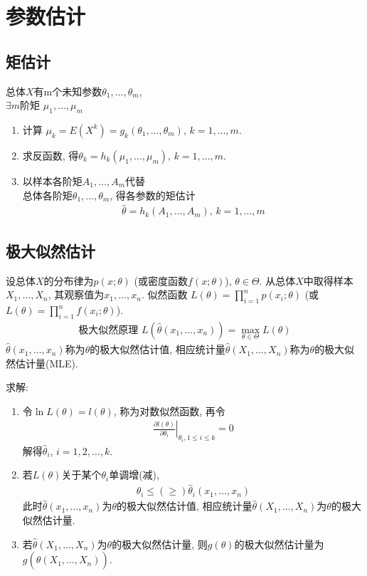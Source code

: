 \newpage
\section{参数估计}

\subsection{矩估计}
总体$X$有m个未知参数$\theta_1,\dots,\theta_m$, \\$\exists m$阶矩 $\mu_1,\dots,\mu_m$
\begin{enumerate}
    \item 计算 $\mu_k=E(X^k)=g_k(\theta_1,\dots,\theta_m),\,k=1,\dots,m$.
    \item 求反函数, 得$\theta_k=h_k(\mu_1,\dots,\mu_m),\,k=1,\dots,m$.
    \item 以样本各阶矩$A_1,\dots,A_m$代替\\总体各阶矩$\theta_1,\dots,\theta_m$, 得各参数的矩估计
    \begin{align*}
        \hat{\theta}=h_k(A_1,\dots,A_m),\,k=1,\dots,m
    \end{align*}
\end{enumerate}

\subsection{极大似然估计}
设总体$X$的分布律为$p(x;\theta)$ (或密度函数$f(x;\theta)$), $\theta\in \Theta$. 从总体$X$中取得样本$X_1,\dots,X_n$, 其观察值为$x_1,\dots,x_n$. 似然函数 $L(\theta)=\prod_{i=1}^n p(x_i;\theta)$ (或$L(\theta)=\prod_{i=1}^n f(x_i;\theta)$). 
\begin{align*}
    \text{极大似然原理 }L\left(\hat{\theta}(x_1,\dots,x_n)\right)=\max_{\theta\in \Theta}L(\theta)
\end{align*}
$\hat{\theta}(x_1,\dots,x_n)$称为$\theta$的极大似然估计值, 相应统计量$\hat{\theta}(X_1,\dots,X_n)$称为$\theta$的极大似然估计量(MLE). 

求解:
\begin{enumerate}
    \item 令$\ln L(\theta)=l(\theta)$, 称为对数似然函数, 再令
    \begin{align*}
        \left.\frac{\partial l(\theta)}{\partial \theta_i}\right|_{\hat{\theta}_i, 1\le i \le k}=0
    \end{align*}
    解得$\hat{\theta}_i$, $i=1,2,\dots,k$. 
    \item 若$L(\theta)$关于某个$\theta_i$单调增(减),
    \begin{align*}
        \theta_i \le (\ge) \hat{\theta}_i(x_1,\dots,x_n)
    \end{align*}
    此时$\hat{\theta}(x_1,\dots,x_n)$为$\theta$的极大似然估计值, 相应统计量$\hat{\theta}(X_1,\dots,X_n)$为$\theta$的极大似然估计量. 
    \item 若$\hat{\theta}(X_1,\dots,X_n)$为$\theta$的极大似然估计量, 则$g(\theta)$的极大似然估计量为$g\left(\hat{\theta}(X_1,\dots,X_n)\right)$. 
\end{enumerate}

